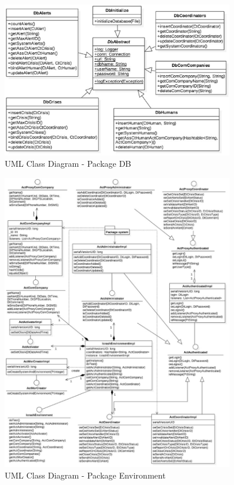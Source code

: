 \begin{figure}[h!]
	\centering
	\includegraphics[width=0.9\textwidth]{./images/dcm_db.eps}
	\caption{UML Class Diagram - Package DB}
\end{figure}

\begin{figure}[h!]
	\centering
	\includegraphics[width=0.9\textwidth]{./images/dcm_environment.eps}
	\caption{UML Class Diagram - Package Environment}
\end{figure}

